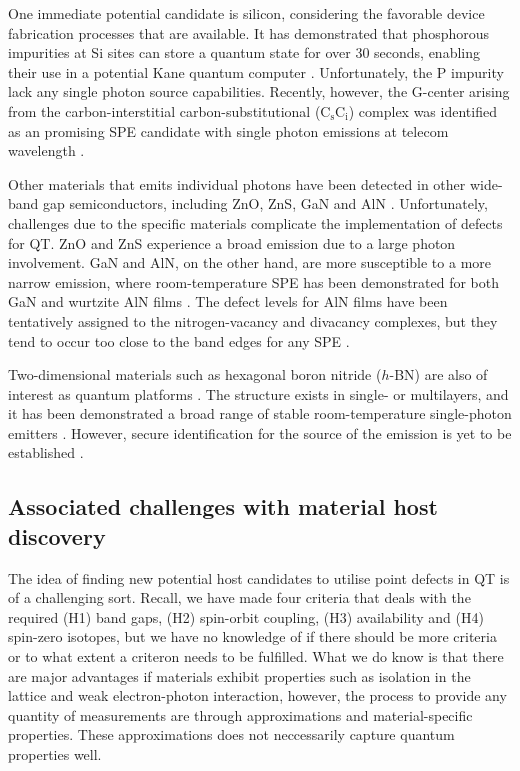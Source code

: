 One immediate potential candidate is silicon, considering the favorable device fabrication processes that are available. It has demonstrated that phosphorous impurities at Si sites can store a quantum state for over $30$ seconds, enabling their use in a potential Kane quantum computer \cite{Zhang2020}. Unfortunately, the P impurity lack any single photon source capabilities. Recently, however, the G-center arising from the carbon-interstitial carbon-substitutional ($\text{C}_{\text{s}}\text{C}_{\text{i}}$) complex was identified as an promising SPE candidate with single photon emissions at telecom wavelength \cite{Redjem2020}.

Other materials that emits individual photons have been detected in other wide-band gap semiconductors, including ZnO, ZnS, GaN and AlN \cite{Zhang2020}. Unfortunately, challenges due to the specific materials complicate the implementation of defects for QT. ZnO and ZnS experience a broad emission due to a large photon involvement. GaN and AlN, on the other hand, are more susceptible to a more narrow emission, where room-temperature SPE has been demonstrated for both GaN \cite{Berhane2018} and wurtzite AlN films \cite{Xue2020}. The defect levels for AlN films have been tentatively assigned to the nitrogen-vacancy and divacancy complexes, but they tend to occur too close to the band edges for any SPE \cite{Zhang2020, Varley2016}.

Two-dimensional materials such as hexagonal boron nitride ($h$-BN) are also of interest as quantum platforms \cite{Toth2019}. The structure exists in single- or multilayers, and it has been demonstrated a broad range of stable room-temperature single-photon emitters \cite{Tran2016, Tran2016a}. However, secure identification for the source of the emission is yet to be established \cite{Weston2018, Abdi2018}.

\subsection{Associated challenges with material host discovery}

The idea of finding new potential host candidates to utilise point defects in QT is of a challenging sort. Recall, we have made four criteria that deals with the required (H1) band gaps, (H2) spin-orbit coupling, (H3) availability and (H4) spin-zero isotopes, but we have no knowledge of if there should be more criteria or to what extent a criteron needs to be fulfilled. What we do know is that there are major advantages if materials exhibit properties such as isolation in the lattice and weak electron-photon interaction, however, the process to provide any quantity of measurements are through approximations and material-specific properties. These approximations does not neccessarily capture quantum properties well.

